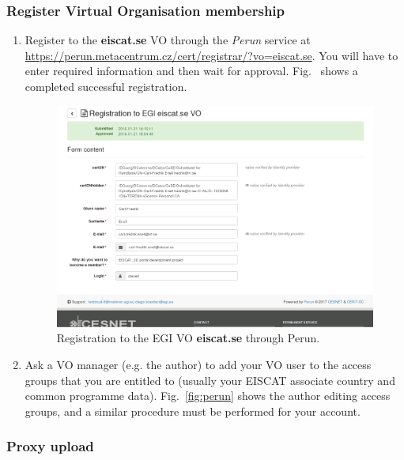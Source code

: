 \documentclass[a4paper]{article}
\begin{document}
\subsubsection{Register Virtual Organisation membership}
\label{sec:regist-virt-organ}

\begin{enumerate}
  
\item Register to the \textbf{eiscat.se} VO through the \emph{Perun}
  service at
  \url{https://perun.metacentrum.cz/cert/registrar/?vo=eiscat.se}. You
  will have to enter required information and then wait for approval. Fig.~ shows a completed successful registration.

  \begin{figure}[htb]
    \centering
    \includegraphics[width=1.0\linewidth]{perun-reg}
    \caption{Registration to the EGI VO \textbf{eiscat.se} through Perun.}
    \label{fig:perun-reg}
  \end{figure}


\item Ask a VO manager (e.g. the author) to add your VO user to the
  access groups that you are entitled to (usually your EISCAT
  associate country and common programme data). Fig.~\ref{fig:perun}
  shows the author editing access groups, and a similar
  procedure must be performed for your account.

\end{enumerate}

\subsubsection{Proxy upload}
\label{sec:proxy-upload}
\end{document}

